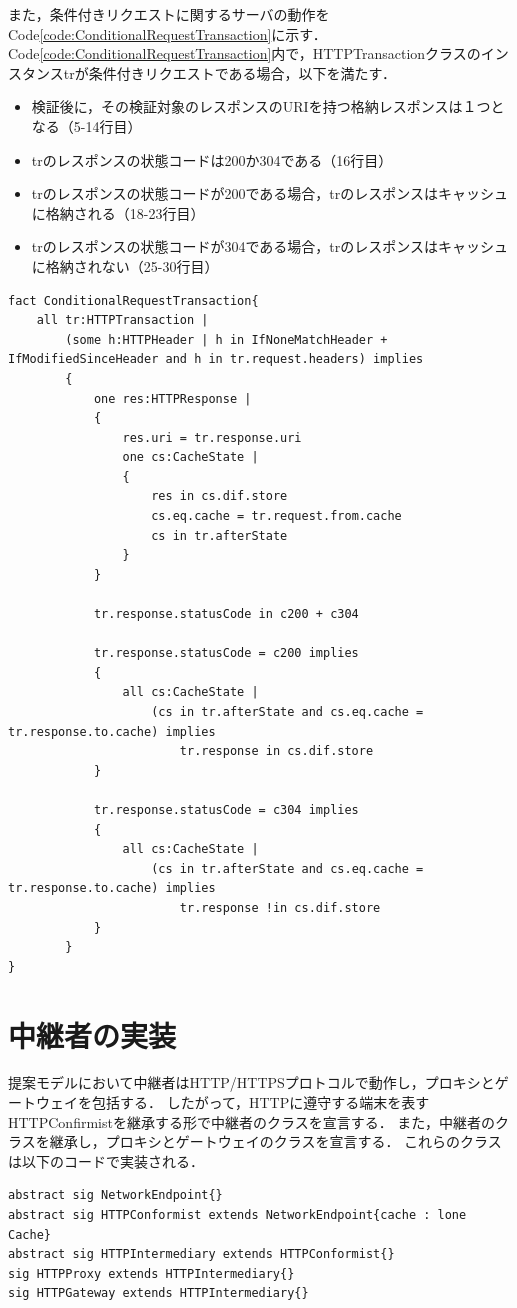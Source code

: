 \documentclass[12pt,a4paper]{jbook}
\begin{document}
また，条件付きリクエストに関するサーバの動作をCode\ref{code:ConditionalRequestTransaction}に示す．
Code\ref{code:ConditionalRequestTransaction}内で，HTTPTransactionクラスのインスタンスtrが条件付きリクエストである場合，以下を満たす．
\begin{itemize}
\item 検証後に，その検証対象のレスポンスのURIを持つ格納レスポンスは１つとなる（5-14行目）
\item trのレスポンスの状態コードは200か304である（16行目）
\item trのレスポンスの状態コードが200である場合，trのレスポンスはキャッシュに格納される（18-23行目）
\item trのレスポンスの状態コードが304である場合，trのレスポンスはキャッシュに格納されない（25-30行目）
\end{itemize}

\begin{lstlisting}[caption=条件付きリクエストに対するサーバの動作, label=code:ConditionalRequestTransaction]
fact ConditionalRequestTransaction{
	all tr:HTTPTransaction |
		(some h:HTTPHeader | h in IfNoneMatchHeader + IfModifiedSinceHeader and h in tr.request.headers) implies
		{
			one res:HTTPResponse |
			{
				res.uri = tr.response.uri
				one cs:CacheState |
				{
					res in cs.dif.store
					cs.eq.cache = tr.request.from.cache
					cs in tr.afterState
				}
			}

			tr.response.statusCode in c200 + c304

			tr.response.statusCode = c200 implies
			{
				all cs:CacheState |
					(cs in tr.afterState and cs.eq.cache = tr.response.to.cache) implies
						tr.response in cs.dif.store
			}

			tr.response.statusCode = c304 implies
			{
				all cs:CacheState |
					(cs in tr.afterState and cs.eq.cache = tr.response.to.cache) implies
						tr.response !in cs.dif.store
			}
		}
}
\end{lstlisting}

\section{中継者の実装}
提案モデルにおいて中継者はHTTP/HTTPSプロトコルで動作し，プロキシとゲートウェイを包括する．
したがって，HTTPに遵守する端末を表すHTTPConfirmistを継承する形で中継者のクラスを宣言する．
また，中継者のクラスを継承し，プロキシとゲートウェイのクラスを宣言する．
これらのクラスは以下のコードで実装される．

\begin{lstlisting}[caption=中継者，プロキシ，ゲートウェイのクラス, label=code:IntermediaryClass]
abstract sig NetworkEndpoint{}
abstract sig HTTPConformist extends NetworkEndpoint{cache : lone Cache}
abstract sig HTTPIntermediary extends HTTPConformist{}
sig HTTPProxy extends HTTPIntermediary{}
sig HTTPGateway extends HTTPIntermediary{}
\end{lstlisting}
\end{document}
